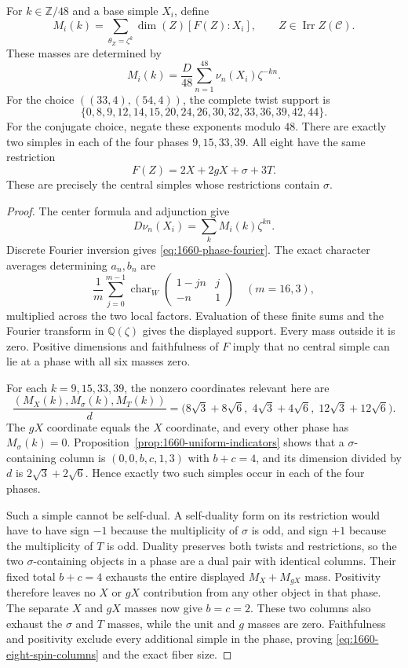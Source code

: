 \begin{theorem}
\label{thm:1660-phase-masses}
For $k\in\mathbb Z/48$ and a base simple $X_i$, define
\[
 M_i(k)=\sum_{\theta_Z=\zeta^k}\dim(Z)[F(Z):X_i],
 \qquad Z\in\operatorname{Irr}Z(\mathcal C).
\]
These masses are determined by
\begin{equation}\label{eq:1660-phase-fourier}
 M_i(k)=\frac D{48}\sum_{n=1}^{48}\nu_n(X_i)\zeta^{-kn}.
\end{equation}
For the choice $((33,4),(54,4))$, the complete twist support is
\[
 \{0,8,9,12,14,15,20,24,26,30,32,33,36,39,42,44\}.
\]
For the conjugate choice, negate these exponents modulo $48$.
There are exactly two simples in each of the four phases
$9,15,33,39$. All eight have the same restriction
\begin{equation}\label{eq:1660-eight-spin-columns}
 F(Z)=2X+2gX+\sigma+3T.
\end{equation}
These are precisely the central simples whose restrictions contain
$\sigma$.
\end{theorem}
\begin{proof}
The center formula \cite[Theorem~4.1]{NS} and adjunction give
\[
 D\nu_n(X_i)=\sum_k M_i(k)\zeta^{kn}.
\]
Discrete Fourier inversion gives \eqref{eq:1660-phase-fourier}.
The exact character averages determining $a_n,b_n$ are
\[
 \frac1m\sum_{j=0}^{m-1}
 \operatorname{char}_{W}\!\begin{pmatrix}1-jn&j\\-n&1\end{pmatrix}
 \quad(m=16,3),
\]
multiplied across the two local factors. Evaluation of these finite
sums and the Fourier transform in $\mathbb Q(\zeta)$ gives the displayed
support. Every mass outside it is zero. Positive dimensions and
faithfulness of $F$ imply that no central simple can lie at a phase
with all six masses zero.

For each $k=9,15,33,39$, the nonzero coordinates relevant here are
\[
 \frac{(M_X(k),M_\sigma(k),M_T(k))}{d}
 =\bigl(8\sqrt3+8\sqrt6,\;4\sqrt3+4\sqrt6,\;
        12\sqrt3+12\sqrt6\bigr).
\]
The $gX$ coordinate equals the $X$ coordinate, and every other phase
has $M_\sigma(k)=0$. Proposition~\ref{prop:1660-uniform-indicators}
shows that a $\sigma$-containing column is
$(0,0,b,c,1,3)$ with $b+c=4$, and its dimension divided by $d$ is
$2\sqrt3+2\sqrt6$. Hence exactly two such simples occur in each
of the four phases.

Such a simple cannot be self-dual. A self-duality form on its
restriction would have to have sign $-1$ because the multiplicity
of $\sigma$ is odd, and sign $+1$ because the multiplicity of $T$
is odd. Duality preserves both twists and restrictions, so the two
$\sigma$-containing objects in a phase are a dual pair with identical
columns. Their fixed total $b+c=4$ exhausts the entire displayed
$M_X+M_{gX}$ mass. Positivity therefore leaves no $X$ or $gX$
contribution from any other object in that phase. The separate $X$
and $gX$ masses now give $b=c=2$. These two columns also exhaust the
$\sigma$ and $T$ masses, while the unit and $g$ masses are zero.
Faithfulness and positivity exclude every additional simple in the
phase, proving \eqref{eq:1660-eight-spin-columns} and the exact fiber size.
\end{proof}

